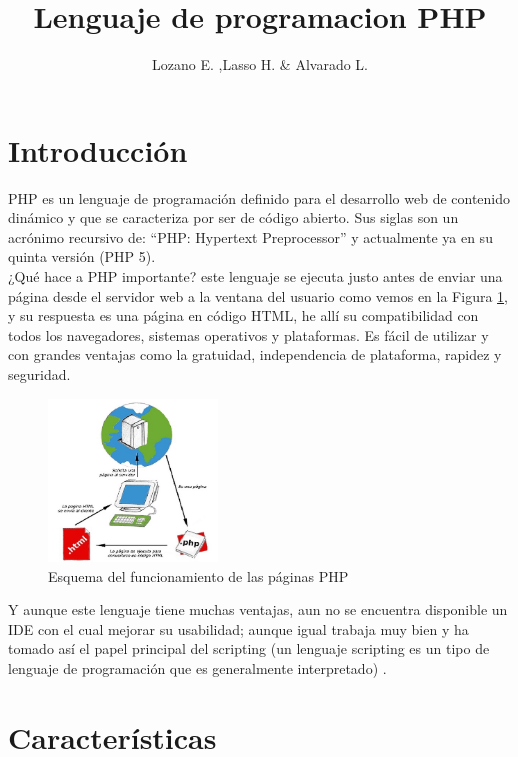 \documentclass[11pt]{article} %
\title{Lenguaje de programacion PHP}
\author{Lozano E. ,Lasso H. \& Alvarado L.}
\begin{document}
\maketitle

\section{Introducción}
PHP es un lenguaje de programación definido para el desarrollo web de contenido dinámico y que se caracteriza por ser de código abierto. Sus siglas son un acrónimo recursivo de: “PHP: Hypertext Preprocessor” y actualmente ya en su quinta versión (PHP 5).
\\¿Qué hace a PHP importante? este lenguaje se ejecuta justo antes de enviar una página desde el servidor web a la ventana del usuario como vemos en la Figura \ref{fig:funcionamiento}, y su respuesta es una página en código HTML, he allí su compatibilidad con todos los navegadores, sistemas operativos y plataformas.  Es fácil de utilizar y con grandes ventajas como la gratuidad, independencia de plataforma, rapidez y seguridad. 

\begin{figure}[H]
  \centering
    \includegraphics[width=0.4\textwidth]{Imagenes/diagrama-php}
  \caption{Esquema del funcionamiento de las páginas PHP}
  \label{fig:funcionamiento}
\end{figure}
 Y aunque este lenguaje tiene muchas ventajas, aun no se encuentra disponible un IDE con el cual mejorar su usabilidad; aunque igual trabaja muy bien y ha tomado así el papel principal del scripting (un lenguaje scripting es un tipo de lenguaje de programación que es generalmente interpretado) \cite{[1]}.

\section{Características}
\end{document}
